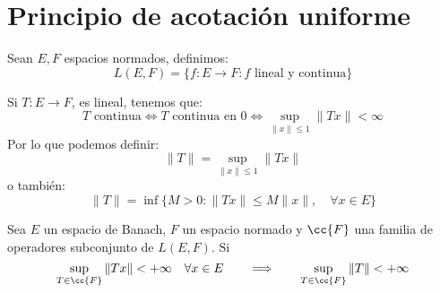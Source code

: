 \chapter{Principio de acotación uniforme}
\begin{definicion}
    Sean $E,F$ espacios normados, definimos:
    \begin{equation*}
        L(E,F) = \{f:E\to F : f \text{\ lineal y continua}\}
    \end{equation*}
\end{definicion}

\begin{definicion} %
    Si $T:E\to F$, es lineal, tenemos que:
    \begin{equation*}
        T \text{\ continua} \Longleftrightarrow T \text{\ continua en\ } 0 \Longleftrightarrow \sup_{\|x\|\leq 1}\|Tx\| < \infty
    \end{equation*}
    Por lo que podemos definir:
    \begin{equation*}
        \|T\| = \sup_{\|x\|\leq 1}\|Tx\|
    \end{equation*}
    o también:
    \begin{equation*}
        \|T\| = \inf\{M>0 : \|Tx\| \leq M\|x\|, \quad \forall x\in E\}
    \end{equation*}
\end{definicion}


\noindent
Sea $E$ un espacio de Banach, $F$ un espacio normado y $\cc{F}$ una familia de operadores subconjunto de $L(E,F)$. Si 
\begin{equation*}
    \sup_{T\in \cc{F}}\|Tx\| < +\infty \quad \forall x\in E \qquad \Longrightarrow \qquad  \sup_{T\in \cc{F}}\|T\| < +\infty
\end{equation*}


